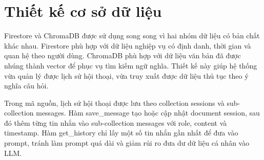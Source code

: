 \section{Thiết kế cơ sở dữ
liệu}

Firestore và ChromaDB được sử dụng song song vì hai nhóm dữ liệu có bản
chất khác nhau. Firestore phù hợp với dữ liệu nghiệp vụ có định danh,
thời gian và quan hệ theo người dùng. ChromaDB phù hợp với dữ liệu văn
bản đã được nhúng thành vector để phục vụ tìm kiếm ngữ nghĩa. Thiết kế
này giúp hệ thống vừa quản lý được lịch sử hội thoại, vừa truy xuất được
dữ liệu thủ tục theo ý nghĩa câu hỏi.

Trong mã nguồn, lịch sử hội thoại được lưu theo collection sessions và
sub-collection messages. Hàm save\_message tạo hoặc cập nhật document
session, sau đó thêm từng tin nhắn vào sub-collection messages với role,
content và timestamp. Hàm get\_history chỉ lấy một số tin nhắn gần nhất
để đưa vào prompt, tránh làm prompt quá dài và giảm rủi ro đưa dư dữ
liệu cá nhân vào LLM.

